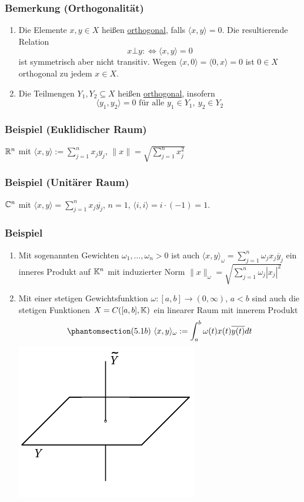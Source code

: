 \subsubsection{Bemerkung (Orthogonalität)}
\begin{enumerate}
\item Die Elemente $x,y\in X$ heißen \underline{orthogonal}, falls $\langle x,y\rangle=0$.  Die resultierende Relation 
\[x \bot y :\Leftrightarrow \langle x,y\rangle=0\]
ist symmetrisch aber nicht transitiv.  Wegen $\langle x,0\rangle=\langle0,x\rangle=0$ ist $0\in X$ orthogonal zu jedem $x\in X$.
\item Die Teilmengen $Y_1,Y_2\subseteq X$ heißen \underline{orthogonal}, insofern
\[\langle y_1,y_2\rangle=0\text{ für alle }y_1\in Y_1,\ y_2\in Y_2\]
\end{enumerate}
\subsubsection{Beispiel (Euklidischer Raum)}
$\mathbb{R} ^n$ mit $\langle x,y\rangle:=\sum _{j=1}^n x_jy_j$, $\|x\|=\sqrt{\sum _{j=1}^nx_j^2}$
\subsubsection{Beispiel (Unitärer Raum)}
$\mathbb{C} ^n$ mit $\langle x,y\rangle=\sum _{j=1}^n x_j \overline{y_j}$, $n=1$, $\langle i,i\rangle=i\cdot (-1)=1$.
\subsubsection{Beispiel}
\label{5.1.6}
\numbers
\begin{enumerate}
\item Mit sogenannten Gewichten $\omega_1,\dots,\omega_n>0$ ist auch $\langle x,y \rangle_\omega=\sum_{j=1}^n \omega_j x_j \overline{y}_j$ ein inneres Produkt auf $\mathbb{K}^n$ mit induzierter Norm $\|x\|_\omega= \sqrt{\sum_{j=1}^n \omega_j |x_j|^2}$
\item Mit einer stetigen Gewichtsfunktion $\omega:[a,b]\rightarrow(0,\infty)$, $a<b$ sind auch die stetigen Funktionen $X=C([a,b],\mathbb{K})$ ein linearer Raum mit innerem Produkt
\[\phantomsection\label{5.1b}(5.1b)\ \langle x, y\rangle_\omega:=\int_a^b \omega(t)x(t)\overline{y(t)}dt\]
\includegraphics[scale=0.4]{5-1-6.jpg}
\end{enumerate}
